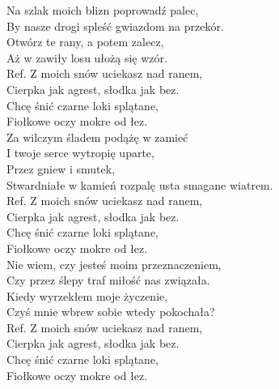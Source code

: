
Na szlak moich blizn poprowadź palec,  \\
By nasze drogi spleść gwiazdom na przekór. \\
Otwórz te rany, a potem zalecz, \\
Aż w zawiły losu ułożą się wzór.  \\
\hops
Ref. Z moich snów uciekasz nad ranem,  \\
 Cierpka jak agrest, słodka jak bez. \\
 Chcę śnić czarne loki splątane,  \\
 Fiołkowe oczy mokre od łez. \\
\hops
Za wilczym śladem podążę w zamieć \\
I twoje serce wytropię uparte, \\
Przez gniew i smutek,  \\
Stwardniałe w kamień rozpalę usta smagane wiatrem.  \\
\hops
Ref. Z moich snów uciekasz nad ranem,  \\
 Cierpka jak agrest, słodka jak bez. \\
 Chcę śnić czarne loki splątane,  \\
 Fiołkowe oczy mokre od łez. \\
\hops
Nie wiem, czy jesteś moim przeznaczeniem, \\
Czy przez ślepy traf miłość nas związała. \\
Kiedy wyrzekłem moje życzenie, \\
Czyś mnie wbrew sobie wtedy pokochała? \\
\hops
Ref. Z moich snów uciekasz nad ranem,  \\
 Cierpka jak agrest, słodka jak bez. \\
 Chcę śnić czarne loki splątane,  \\
 Fiołkowe oczy mokre od łez.
